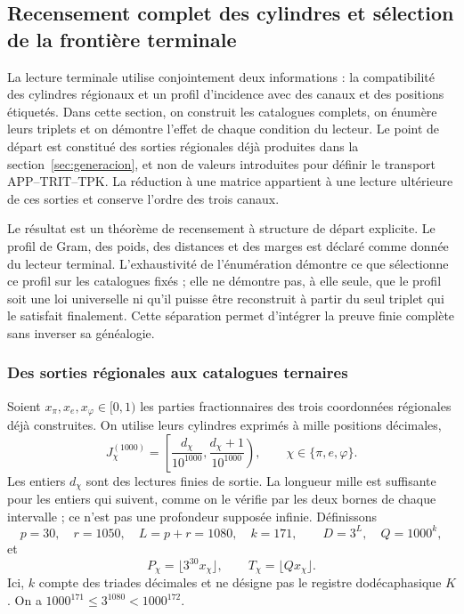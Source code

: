 \subsection{Recensement complet des cylindres et sélection de la frontière terminale}
\label{censo:terminal-completo}

La lecture terminale utilise conjointement deux informations : la compatibilité des cylindres régionaux et un profil d'incidence avec des canaux et des positions étiquetés. Dans cette section, on construit les catalogues complets, on énumère leurs triplets et on démontre l'effet de chaque condition du lecteur. Le point de départ est constitué des sorties régionales déjà produites dans la section~\ref{sec:generacion}, et non de valeurs introduites pour définir le transport APP--TRIT--TPK. La réduction à une matrice appartient à une lecture ultérieure de ces sorties et conserve l'ordre des trois canaux.

Le résultat est un théorème de recensement à structure de départ explicite.
Le profil de Gram, des poids, des distances et des marges est déclaré comme donnée du
lecteur terminal. L'exhaustivité de l'énumération démontre ce que sélectionne
ce profil sur les catalogues fixés ; elle ne démontre pas, à elle seule, que le
profil soit une loi universelle ni qu'il puisse être reconstruit à partir du seul triplet
qui le satisfait finalement. Cette séparation permet d'intégrer la preuve
finie complète sans inverser sa généalogie.

\subsubsection{Des sorties régionales aux catalogues ternaires}

Soient \(x_\pi,x_e,x_\varphi\in[0,1)\) les parties fractionnaires des
trois coordonnées régionales déjà construites. On utilise leurs cylindres
exprimés à mille positions décimales,
\[
 J_\chi^{(1000)}=
 \left[\frac{d_\chi}{10^{1000}},
       \frac{d_\chi+1}{10^{1000}}\right),
 \qquad \chi\in\{\pi,e,\varphi\}.
\]
Les entiers \(d_\chi\) sont des lectures finies de sortie. La longueur mille
est suffisante pour les entiers qui suivent, comme on le vérifie par les
deux bornes de chaque intervalle ; ce n'est pas une profondeur supposée infinie.
Définissons
\begin{equation}
 p=30,\quad r=1050,\quad L=p+r=1080,\quad k=171,
 \qquad D=3^L,\quad Q=1000^k,
 \label{censo:parametros}
\end{equation}
et
\[
 P_\chi=\lfloor3^{30}x_\chi\rfloor,\qquad
 T_\chi=\lfloor Qx_\chi\rfloor.
\]
Ici, \(k\) compte des triades décimales et ne désigne pas le registre dodécaphasique \(K\). On a \(1000^{171}\leq3^{1080}<1000^{172}\).

